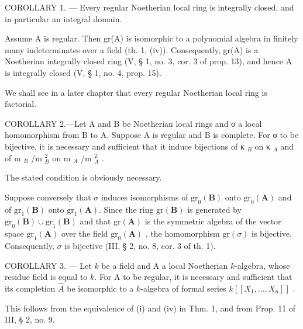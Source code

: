 COROLLARY 1. --- Every regular Noetherian local ring is integrally closed, and in particular an integral domain.

Assume A is regular. Then gr(A) is isomorphic to a polynomial algebra in finitely many indeterminates over a field (th. 1, (iv)). Consequently, gr(A) is a Noetherian integrally closed ring (V, § 1, no. 3, cor. 3 of prop. 13), and hence A is integrally closed (V, § 1, no. 4, prop. 15).

We shall see in a later chapter that every regular Noetherian local ring is factorial.

COROLLARY 2.---Let A and B be Noetherian local rings and σ a local homomorphism from B to A. Suppose A is regular and B is complete. For σ to be bijective, it is necessary and sufficient that it induce bijections of κ \(_{B}\) on κ \(_{A}\) and of m \(_{B}\) /m \(_{B}^{2}\) on m \(_{A}\) /m \(_{A}^{2}\) .

The stated condition is obviously necessary.

Suppose conversely that \(\sigma\) induces isomorphisms of \(\mathrm{gr}_{0}(\mathbf{B})\) onto \(\mathrm{gr}_{0}(\mathbf{A})\) and of \(\mathrm{gr}_{1}(\mathbf{B})\) onto \(\mathrm{gr}_{1}(\mathbf{A})\). Since the ring \(\mathrm{gr}(\mathbf{B})\) is generated by \(\mathrm{gr}_{0}(\mathbf{B}) \cup \mathrm{gr}_{1}(\mathbf{B})\) and that \(\mathrm{gr}(\mathbf{A})\) is the symmetric algebra of the vector space \(\mathrm{gr}_{1}(\mathbf{A})\) over the field \(\mathrm{gr}_{0}(\mathbf{A})\) , the homomorphism \(\mathrm{gr}(\sigma)\) is bijective. Consequently, \(\sigma\) is bijective (III, § 2, no. 8, cor. 3 of th. 1).

COROLLARY 3. --- Let \(k\) be a field and A a local Noetherian \(k\)-algebra, whose residue field is equal to \(k\). For A to be regular, it is necessary and sufficient that its completion \(\hat{A}\) be isomorphic to a \(k\)-algebra of formal series \(k[[X_1, ..., X_n]]\) .

This follows from the equivalence of (i) and (iv) in Thm. 1, and from Prop. 11 of III, § 2, no. 9.

